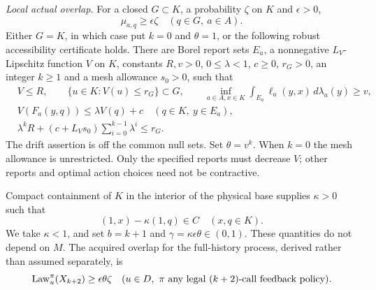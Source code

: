 \begin{definition}
\emph{Local actual overlap.} For a closed $G\subset K$, a probability $\zeta$ on $K$ and $\epsilon>0$,
\begin{equation}\label{eq:local-overlap}
 \mu_{a,q}\ge\epsilon\zeta\quad(q\in G,\ a\in A).
\end{equation}
Either $G=K$, in which case put $k=0$ and $\theta=1$, or the following robust accessibility certificate holds. There are Borel report sets $E_a$, a nonnegative $L_V$-Lipschitz function $V$ on $K$, constants $R,v>0$, $0\le\lambda<1$, $c\ge0$, $r_G>0$, an integer $k\ge1$ and a mesh allowance $s_0>0$, such that
\begin{align}
 &V\le R,\qquad \{u\in K:V(u)\le r_G\}\subset G,\qquad
 \inf_{a\in A,x\in K}\int_{E_a}\ell_a(y,x)\,d\lambda_a(y)\ge v,\label{eq:quiet-mass}\\
 &V(F_a(y,q))\le\lambda V(q)+c
       \quad(q\in K,\ y\in E_a),\label{eq:quiet-drift}\\
 &\lambda^k R+(c+L_Vs_0)\sum_{i=0}^{k-1}\lambda^i\le r_G.
       \label{eq:quiet-margin}
\end{align}
The drift assertion is off the common null sets. Set $\theta=v^k$. When $k=0$ the mesh allowance is unrestricted. Only the specified reports must decrease $V$; other reports and optimal action choices need not be contractive.
\end{definition}

Compact containment of $K$ in the interior of the physical base supplies $\kappa>0$ such that
\begin{equation}\label{eq:cone-comparison}
 (1,x)-\kappa(1,q)\in C\quad(x,q\in K).
\end{equation}
We take $\kappa<1$, and set $b=k+1$ and $\gamma=\kappa\epsilon\theta\in(0,1)$. These quantities do not depend on $M$. The acquired overlap for the full-history process, derived rather than assumed separately, is
\begin{equation}\label{eq:overlap}
 \operatorname{Law}_u^\pi(X_{k+2})\ge\epsilon\theta\zeta
 \quad(u\in D,\ \pi\text{ any legal $(k+2)$-call feedback policy}).
\end{equation}

